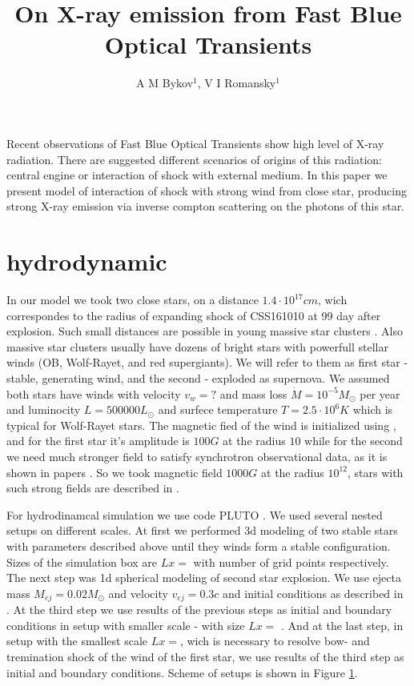 \documentclass[a4paper,12pt]{extreport}
\begin{document}
	\title{On X-ray emission from Fast Blue Optical Transients}
	
	\author{A M Bykov$^{1}$, V I Romansky$^{1}$}
	

Recent observations of Fast Blue Optical Transients \cite{Margutti2019,Ho2020,Coppejans2020} show high level of X-ray radiation. There are suggested different scenarios of  origins of this radiation: central engine or interaction of shock with external medium. In this paper we present model of interaction of shock with strong wind from close star, producing strong X-ray emission via inverse compton scattering on the photons of this star.

\section{hydrodynamic}
In our model we took two close stars, on a distance $1.4\cdot10^{17} cm$, wich correspondes to the radius of expanding shock of CSS161010 at 99 day after explosion. Such small distances are possible in young massive star clusters \cite{}. Also massive star clusters usually have dozens of bright stars with powerfull stellar winds (OB, Wolf-Rayet, and red supergiants). We will refer to them as first star - stable, generating wind, and the second - exploded as supernova. We assumed both stars have winds with velocity $v_w = ?$ and mass loss $\dot{M} = 10^{-5} M_\odot $ per year and luminocity $L=500000 L_\odot$ and surfece temperature $T = 2.5\cdot10^6 K$ which is typical for Wolf-Rayet stars. The magnetic fied of the wind is initialized using \cite{}, and for the first star  it's amplitude is $100 G$ at the radius $10$ while for the second we need much stronger field to satisfy synchrotron observational data, as it is shown in papers \cite{Coppejans2020, BykovUniverse}. So we took magnetic field $1000 G$ at the radius $10^{12}$, stars with such strong fields are described in \cite{}.

For hydrodinamcal simulation we use code PLUTO \cite{MignonePluto}. We used several nested setups on different scales. At first we performed 3d modeling of two stable stars with parameters described above until they winds form a stable configuration. Sizes of the simulation box are $Lx = $ with number of grid points respectively. The next step was 1d spherical modeling of second star explosion. We use ejecta mass $M_{ej} = 0.02 M_\odot$ and velocity $v_{ej} = 0.3 c$ and initial conditions as described in \cite{}. At the third step we use results of the previous steps as initial and boundary conditions in setup with smaller scale - with size $Lx = $ . And at the last step, in setup with the smallest scale $Lx = $, wich is necessary to resolve bow- and tremination shock of the wind of the first star, we use results of the third step as initial and boundary conditions. Scheme of setups is shown in Figure \ref{}.
\end{document}
